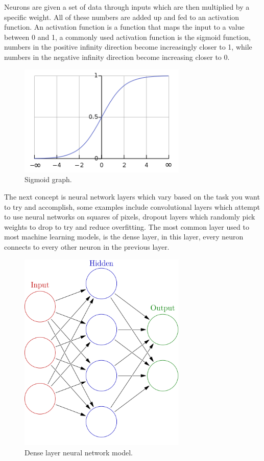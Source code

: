 \documentclass[a4paper,oneside,phd,etd]{BYUPhys}
\begin{document}
Neurons are given a set of data through inputs which are then multiplied by a specific weight. All of these numbers are added up and fed to an activation function. An activation function is a function that maps the input to a value between 0 and 1, a commonly used activation function is the sigmoid function, numbers in the positive infinity direction become increasingly closer to 1, while numbers in the negative infinity direction become increasing closer to 0.
\begin{figure}[H]
\centering
\includegraphics[width=8cm]{pictures/sigmoid.png}
\caption{Sigmoid graph\cite{fig:sigmoid}.}
\label{fig:sigmoid}
\end{figure}

The next concept is neural network layers which vary based on the task you want to try and accomplish, some examples include convolutional layers which attempt to use neural networks on squares of pixels, dropout layers which randomly pick weights to drop to try and reduce overfitting. The most common layer used to most machine learning models, is the dense layer, in this layer, every neuron connects to every other neuron in the previous layer.
\begin{figure}[H]
\centering
\includegraphics[width=8cm]{pictures/neural_network_model.png}
\caption{Dense layer neural network model\cite{fig:neural_network_model}.}
\label{fig:neural_network_model}
\end{figure}
\end{document}
